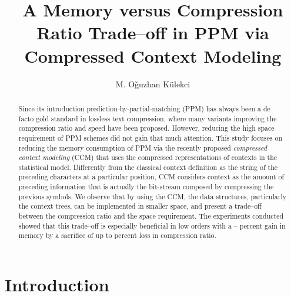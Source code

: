 \documentclass[runningheads,a4paper]{llncs}
\begin{document}
\mainmatter  

\title{A Memory versus Compression Ratio Trade--off  in {PPM} via Compressed Context Modeling}




\author{M. O\v{g}uzhan K\"{u}lekci 
}




\maketitle

\sloppy

\begin{abstract}
Since its introduction prediction-by-partial-matching (PPM) has always been a de facto gold standard in lossless text
compression, where many variants improving the compression ratio and speed have been proposed. 
However, reducing the high space requirement of PPM schemes did not gain that much attention.
This study focuses on reducing the memory consumption of {PPM} via the recently proposed
\emph{compressed context modeling} (CCM) that uses the compressed representations of contexts in the
statistical model. 
Differently from the classical context definition  as the string  of the preceding characters at a particular position,
CCM considers context as the  amount of preceding information that is actually the bit-stream composed by compressing
the previous symbols.  
We observe that by using the {CCM}, the data structures, particularly the context trees, can be implemented in smaller
space, and present a trade--off between the compression ratio and the space requirement. The experiments conducted
showed that this trade--off is especially beneficial in low orders with a  -- percent gain
in memory by a sacrifice of up to  percent loss in compression ratio. 
\end{abstract}

\section{Introduction}
\end{document}
